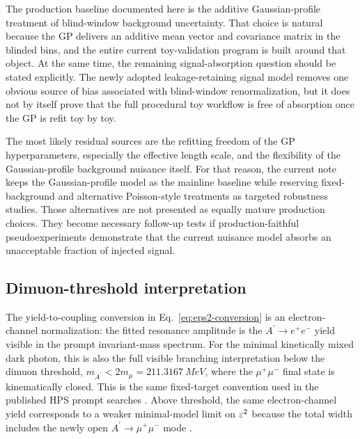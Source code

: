 The production baseline documented here is the additive Gaussian-profile treatment of
blind-window background uncertainty. That choice is natural because the GP delivers an
additive mean vector and covariance matrix in the blinded bins, and the entire current
toy-validation program is built around that object. At the same time, the remaining
signal-absorption question should be stated explicitly. The newly adopted
leakage-retaining signal model removes one obvious source of bias associated with
blind-window renormalization, but it does not by itself prove that the full procedural
toy workflow is free of absorption once the GP is refit toy by toy.

The most likely residual sources are the refitting freedom of the GP hyperparameters,
especially the effective length scale, and the flexibility of the Gaussian-profile
background nuisance itself. For that reason, the current note keeps the
Gaussian-profile model as the mainline baseline while reserving fixed-background and
alternative Poisson-style treatments as targeted robustness studies. Those alternatives
are not presented as equally mature production choices. They become necessary
follow-up tests if production-faithful pseudoexperiments demonstrate that the current
nuisance model absorbs an unacceptable fraction of injected signal.

\subsection{Dimuon-threshold interpretation}
\label{sec:methodology-dimuon-threshold}

The yield-to-coupling conversion in Eq.~\eqref{eq:eps2-conversion} is an
electron-channel normalization: the fitted resonance amplitude is the
$A^\prime\to e^+e^-$ yield visible in the prompt invariant-mass spectrum. For the
minimal kinetically mixed dark photon, this is also the full visible branching
interpretation below the dimuon threshold, $m_{A^\prime}<2m_\mu=\SI{211.3167}{MeV}$,
where the $\mu^+\mu^-$ final state is kinematically closed. This is the same
fixed-target convention used in the published HPS prompt searches
\cite{EssigEtAl2011,HPS2015DarkPhoton,HPS2016PromptLong}. Above threshold, the same
electron-channel yield corresponds to a weaker minimal-model limit on $\varepsilon^2$ because
the total width includes the newly open $A^\prime\to\mu^+\mu^-$ mode
\cite{Holdom1986,Fabbrichesi2020DarkPhoton}.

